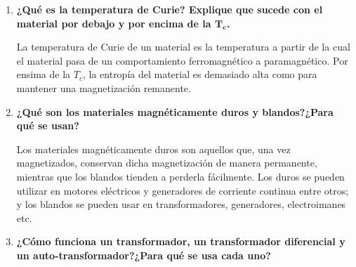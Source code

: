 \documentclass[a4paper,10pt,fleqn,oneside]{article}
\begin{document}
\begin{enumerate}[1.]
	\item \textbf{¿Qué es la temperatura de Curie? Explique que sucede con el material por debajo y por encima de la $\mathbf{T_c}$.}
	
	La temperatura de Curie de un material es la temperatura a partir de la cual el material pasa de un comportamiento ferromagnético a paramagnético. Por ensima de la $T_c$, la entropía del material es demasiado alta como para mantener una magnetización remanente. 
	\item \textbf{¿Qué son los materiales magnéticamente duros y blandos?¿Para qué se usan?}
	
	Los materiales magnéticamente duros son aquellos que, una vez magnetizados, conservan dicha magnetización de manera permanente, mientras que los blandos tienden a perderla fácilmente.
	Los duros se pueden utilizar en motores eléctricos y generadores de corriente continua entre otros; y los blandos se pueden usar en transformadores, generadores, electroimanes etc.
	
	\item \textbf{¿Cómo funciona un transformador, un transformador diferencial y un auto-transformador?¿Para qué se usa cada uno?}
	

\end{enumerate}
\end{document}
